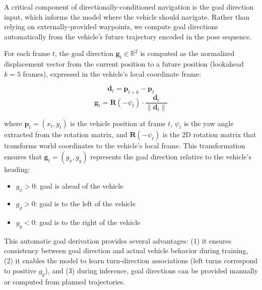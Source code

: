 \documentclass[sensors,article,submit,pdftex,moreauthors]{Definitions/mdpi}
\begin{document}
A critical component of directionally-conditioned navigation is the goal direction input, which informs the model where the vehicle should navigate. Rather than relying on externally-provided waypoints, we compute goal directions automatically from the vehicle's future trajectory encoded in the pose sequence.

For each frame $t$, the goal direction $\mathbf{g}_t \in \mathbb{R}^2$ is computed as the normalized displacement vector from the current position to a future position (lookahead $k=5$ frames), expressed in the vehicle's local coordinate frame:

\begin{equation}
    \mathbf{d}_t = \mathbf{p}_{t+k} - \mathbf{p}_t
\end{equation}
\begin{equation}
    \mathbf{g}_t = \mathbf{R}(-\psi_t) \cdot \frac{\mathbf{d}_t}{\|\mathbf{d}_t\|}
\end{equation}

where $\mathbf{p}_t = (x_t, y_t)$ is the vehicle position at frame $t$, $\psi_t$ is the yaw angle extracted from the rotation matrix, and $\mathbf{R}(-\psi_t)$ is the 2D rotation matrix that transforms world coordinates to the vehicle's local frame. This transformation ensures that $\mathbf{g}_t = (g_x, g_y)$ represents the goal direction relative to the vehicle's heading:
\begin{itemize}
    \item $g_x > 0$: goal is ahead of the vehicle
    \item $g_y > 0$: goal is to the left of the vehicle
    \item $g_y < 0$: goal is to the right of the vehicle
\end{itemize}

This automatic goal derivation provides several advantages: (1) it ensures consistency between goal direction and actual vehicle behavior during training, (2) it enables the model to learn turn-direction associations (left turns correspond to positive $g_y$), and (3) during inference, goal directions can be provided manually or computed from planned trajectories.
\end{document}
